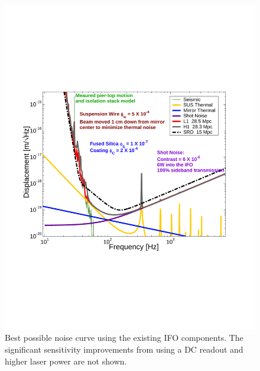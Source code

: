  
\begin{figure}[!h]
\centerline{
  \includegraphics[angle=0,width=6.5in]{Figures/Chap8/s5noise2.pdf}}
\caption[S5 Noise]{Best possible noise curve using the existing IFO components. The significant
                   sensitivity improvements from using a DC readout and higher laser power
                   are not shown.}
\label{fig:S5noise}
\end{figure}



